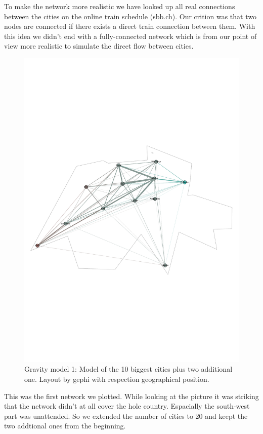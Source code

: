 \documentclass[11pt]{article}
\begin{document}
To make the network more realistic we have looked up all real connections between the cities on the online train schedule (sbb.ch). Our crition was that two nodes are connected if there exists a direct train connection between them. With this idea we didn't end with a fully-connected network which is from our point of view more realistic to simulate the dircet flow between cities.

\begin{figure}
\centering
\includegraphics[scale=0.25]{switzerland_network1}
 \caption{Gravity model 1: Model of the 10 biggest cities plus two additional one. Layout by gephi with respection geographical position.}
\end{figure}

This was the first network we plotted. While looking at the picture it was striking that the network didn't at all cover the hole country. Espacially the south-west part was unattended. So we extended the number of cities to 20 and keept the two addtional ones from the beginning.
\end{document}
